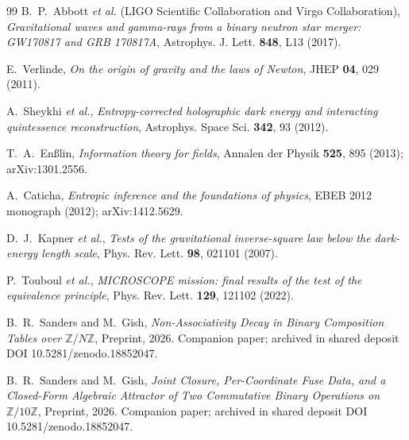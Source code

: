 \documentclass[11pt,reqno]{amsart}
\theoremstyle{plain}
\theoremstyle{definition}
\theoremstyle{remark}
\begin{document}
\begin{thebibliography}{99}
B.~P.~Abbott \emph{et al.} (LIGO Scientific Collaboration and Virgo Collaboration),
\emph{Gravitational waves and gamma-rays from a binary neutron star merger:
GW170817 and GRB 170817A},
Astrophys. J. Lett. \textbf{848}, L13 (2017).

E.~Verlinde,
\emph{On the origin of gravity and the laws of Newton},
JHEP \textbf{04}, 029 (2011).

A.~Sheykhi \emph{et al.},
\emph{Entropy-corrected holographic dark energy and interacting quintessence reconstruction},
Astrophys. Space Sci. \textbf{342}, 93 (2012).

T.~A.~En{\ss}lin,
\emph{Information theory for fields},
Annalen der Physik \textbf{525}, 895 (2013); arXiv:1301.2556.

A.~Caticha,
\emph{Entropic inference and the foundations of physics},
EBEB 2012 monograph (2012); arXiv:1412.5629.

D.~J.~Kapner \emph{et al.},
\emph{Tests of the gravitational inverse-square law below the dark-energy length scale},
Phys. Rev. Lett. \textbf{98}, 021101 (2007).

P.~Touboul \emph{et al.},
\emph{MICROSCOPE mission: final results of the test of the equivalence principle},
Phys. Rev. Lett. \textbf{129}, 121102 (2022).

B.~R.~Sanders and M.~Gish,
\emph{Non-Associativity Decay in Binary Composition Tables over $\mathbb{Z}/N\mathbb{Z}$},
Preprint, 2026. Companion paper; archived in shared deposit DOI 10.5281/zenodo.18852047.

B.~R.~Sanders and M.~Gish,
\emph{Joint Closure, Per-Coordinate Fuse Data, and a Closed-Form Algebraic
Attractor of Two Commutative Binary Operations on $\mathbb{Z}/10\mathbb{Z}$},
Preprint, 2026. Companion paper; archived in shared deposit DOI 10.5281/zenodo.18852047.

\end{thebibliography}
\end{document}
